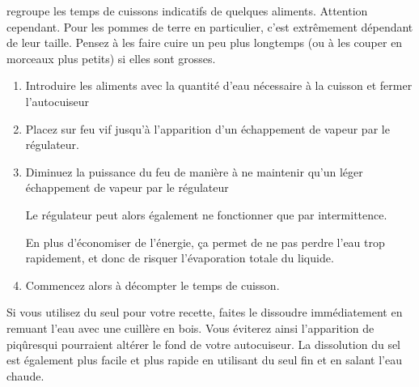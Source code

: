 \documentclass[a4paper,twoside,openright]{report}
\begin{document}
 regroupe les temps de cuissons indicatifs de quelques aliments. Attention cependant. Pour les pommes de terre en particulier, c'est extrêmement dépendant de leur taille. Pensez à les faire cuire un peu plus longtemps (ou à les couper en morceaux plus petits) si elles sont grosses.

\begin{enumerate}
\item Introduire les aliments avec la quantité d'eau nécessaire à la cuisson et fermer l'autocuiseur
\item Placez sur feu vif jusqu'à l'apparition d'un échappement de vapeur par le régulateur.
\item Diminuez la puissance du feu de manière à ne maintenir qu'un léger échappement de vapeur par le régulateur 
\begin{remarque}
Le régulateur peut alors également ne fonctionner que par intermittence.

En plus d'économiser de l'énergie, ça permet de ne pas perdre l'eau trop rapidement, et donc de risquer l'évaporation totale du liquide.
\end{remarque}
\item Commencez alors à décompter le temps de cuisson.
\end{enumerate}

\begin{remarque}
Si vous utilisez du seul pour votre recette, faites le dissoudre immédiatement en remuant l'eau avec une cuillère en bois. Vous éviterez ainsi l'apparition de \og piqûres\fg qui pourraient altérer le fond de votre autocuiseur. La dissolution du sel est également plus facile et plus rapide en utilisant du seul fin et en salant l'eau chaude.
\end{remarque}
\end{document}
